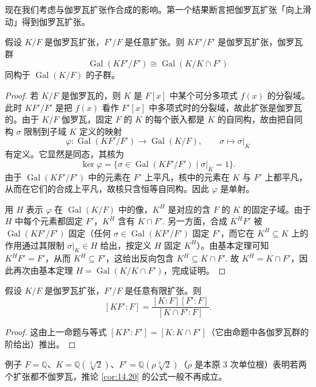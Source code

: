 现在我们考虑与伽罗瓦扩张作合成的影响。第一个结果断言把伽罗瓦扩张「向上滑动」得到伽罗瓦扩张。

\begin{proposition}\label{pro:14.19}
假设 \(K/F\) 是伽罗瓦扩张，\(F'/F\) 是任意扩张。则 \(KF'/F'\) 是伽罗瓦扩张，伽罗瓦群
\[
\operatorname{Gal}(KF'/F') \cong \operatorname{Gal}(K/K \cap F')
\]
同构于 \(\operatorname{Gal}(K/F)\) 的子群。
\end{proposition}

\begin{proof}
若 \(K/F\) 是伽罗瓦的，则 \(K\) 是 \(F[x]\) 中某个可分多项式 \(f(x)\) 的分裂域。此时 \(KF'/F'\) 是把 \(f(x)\) 看作 \(F'[x]\) 中多项式时的分裂域，故此扩张是伽罗瓦的。由于 \(K/F\) 伽罗瓦，固定 \(F\) 的 \(K\) 的每个嵌入都是 \(K\) 的自同构，故由把自同构 \(\sigma\) 限制到子域 \(K\) 定义的映射
\[
\varphi : \operatorname{Gal}(KF'/F') \to \operatorname{Gal}(K/F), \qquad \sigma \mapsto \sigma|_K
\]
有定义。它显然是同态，其核为
\[
\ker\varphi = \{\sigma \in \operatorname{Gal}(KF'/F') \mid \sigma|_K = 1\}.
\]
由于 \(\operatorname{Gal}(KF'/F')\) 中的元素在 \(F'\) 上平凡，核中的元素在 \(K\) 与 \(F'\) 上都平凡，从而在它们的合成上平凡，故核只含恒等自同构。因此 \(\varphi\) 是单射。

用 \(H\) 表示 \(\varphi\) 在 \(\operatorname{Gal}(K/F)\) 中的像，\(K^H\) 是对应的含 \(F\) 的 \(K\) 的固定子域。由于 \(H\) 中每个元素都固定 \(F'\)，\(K^H\) 含有 \(K \cap F'\). 另一方面，合成 \(K^HF'\) 被 \(\operatorname{Gal}(KF'/F')\) 固定（任何 \(\sigma \in \operatorname{Gal}(KF'/F')\) 固定 \(F'\)，而它在 \(K^H \subseteq K\) 上的作用通过其限制 \(\sigma|_K \in H\) 给出，按定义 \(H\) 固定 \(K^H\)）。由基本定理可知 \(K^HF' = F'\)，从而 \(K^H \subseteq F'\)，这给出反向包含 \(K^H \subseteq K \cap F'\). 故 \(K^H = K \cap F'\)，因此再次由基本定理 \(H = \operatorname{Gal}(K/K \cap F')\)，完成证明。
\end{proof}

\begin{corollary}\label{cor:14.20}
假设 \(K/F\) 是伽罗瓦扩张，\(F'/F\) 是任意有限扩张。则
\[
[KF':F] = \frac{[K:F][F':F]}{[K \cap F':F]}.
\]
\end{corollary}

\begin{proof}
这由上一命题与等式 \([KF':F'] = [K:K \cap F']\)（它由命题中各伽罗瓦群的阶给出）推出。
\end{proof}

例子 \(F = \mathbb{Q}\)、\(K = \mathbb{Q}(\sqrt[3]{2})\)、\(F' = \mathbb{Q}(\rho\sqrt[3]{2})\)（\(\rho\) 是本原 3 次单位根）表明若两个扩张都不伽罗瓦，推论 \ref{cor:14.20} 的公式一般不再成立。

